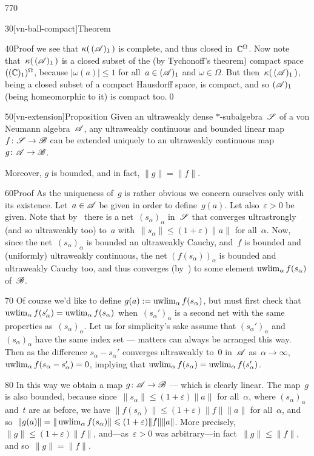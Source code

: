 \begin{parsec}{770}
\begin{point}{30}[vn-ball-compact]{Theorem}
\begin{point}{40}{Proof}
we see that $\kappa(\,(\mathscr{A})_1\,)$
is complete,
and thus closed in~$\mathbb{C}^\Omega$.
Now note that~$\kappa(\,(\mathscr{A})_1\,)$ is a closed subset 
of the (by Tychonoff's theorem) compact
space~$((\mathbb{C})_1)^\Omega$, 
because $\left|\omega(a)\right|\leq 1$ for all~$a\in(\mathscr{A})_1$
and $\omega\in\Omega$.
But then~$\kappa(\,(\mathscr{A})_1\,)$,
being a closed subset of a compact Hausdorff space,
is compact,
and so $(\mathscr{A})_1$ (being homeomorphic to it) is compact too.\qed
\end{point}
\end{point}
\begin{point}{50}[vn-extension]{Proposition}%
Given an ultraweakly dense $*$-subalgebra~$\mathscr{S}$
of a von Neumann algebra~$\mathscr{A}$,
any ultraweakly continuous and bounded linear map~$f\colon \mathscr{S}\to\mathscr{B}$
can be extended uniquely
to an ultraweakly continuous map~$g\colon \mathscr{A}\to\mathscr{B}$.

Moreover, $g$ is bounded,
and in fact,  $\|g\|=\|f\|$.
\begin{point}{60}{Proof}%
As the uniqueness of~$g$ is rather obvious
we concern ourselves only with its existence.
Let~$a\in\mathscr{A}$ be given
in order to define~$g(a)$.
Let also~$\varepsilon>0$ be given.
Note that by~ 
there is a net~$(s_\alpha)_\alpha$
in~$\mathscr{S}$
that converges ultrastrongly (and so ultraweakly too)
to~$a$
with~$\|s_\alpha \|\leq(1+\varepsilon)\|a\|$
for all~$\alpha$.
Now,
since the net~$(s_\alpha)_\alpha$
is bounded an ultraweakly Cauchy,
and~$f$ is bounded and (uniformly) ultraweakly continuous,
the net
$(f(s_\alpha))_\alpha$
is bounded and ultraweakly Cauchy too,
and thus converges (by~)
to some element
$\uwlim_\alpha f(s_\alpha)$
of~$\mathscr{B}$.

\begin{point}{70}%
Of course we'd like to define $g(a):=\uwlim_\alpha
f(s_\alpha)$,
but must first check
that $\uwlim_\alpha f(s_\alpha')
=\uwlim_\alpha f(s_\alpha)$
when~$(s_\alpha')_\alpha$ is a second net with the same properties
as~$(s_\alpha)_\alpha$.
Let us for simplicity's sake
assume that $(s_\alpha')_\alpha$ and~$(s_\alpha)_\alpha$
have the same index set
--- matters can always be arranged this way.
Then as the difference $s_\alpha-s_\alpha'$
converges ultraweakly to~$0$ in~$\mathscr{A}$ as~$\alpha\to\infty$,
$\uwlim_\alpha f(s_\alpha-s_\alpha')=0$,
implying that $\uwlim_\alpha f(s_\alpha)
= \uwlim_\alpha f(s_\alpha')$.
\end{point}
\begin{point}{80}%
In this way
we obtain a map $g \colon \mathscr{A}\to\mathscr{B}$
--- which is clearly linear.
The map~$g$ is also bounded,
because since~$\|s_\alpha\|\leq (1+\varepsilon)\|a\|$
for all~$\alpha$,
where $(s_\alpha)_\alpha$ and~$t$ are as before,
we have $\|f (s_\alpha)\|\leq (1+\varepsilon) \|f\|\|a\|$
for all~$\alpha$,
and so~$\|g(a)\|=\|\uwlim_\alpha f(s_\alpha)\|
\leq (1+\varepsilon) \|f \|\|a\|$.
More precisely, $\|g\|\leq (1+\varepsilon)\|f\|$,
and---as~$\varepsilon>0$ was arbitrary---in 
fact~$\|g\|\leq \|f\|$, and so~$\|g\|=\|f\|$.


\end{point}
\end{point}
\end{point}
\end{parsec}
